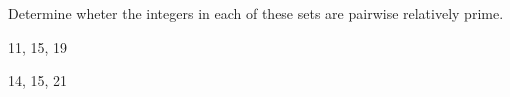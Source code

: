 
%
%
%

	Determine wheter the integers in each of these sets are pairwise relatively prime.
	\begin{subproblem}
		\item 11, 15, 19
		\item 14, 15, 21
	\end{subproblem}

\solution
	\begin{subproblem}
		\item 
		\item 
	\end{subproblem}
